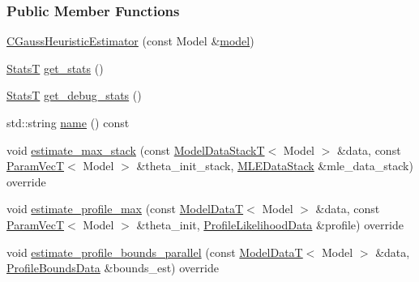 \subsubsection*{Public Member Functions}
\begin{DoxyCompactItemize}
\item 
\hyperlink{classmappel_1_1estimator_1_1CGaussHeuristicEstimator_a2bedca746004a65da22bf0f73b023408}{C\+Gauss\+Heuristic\+Estimator} (const Model \&\hyperlink{classmappel_1_1estimator_1_1Estimator_a2f157410771fb79a20d4d54e505750d0}{model})
\item 
\hyperlink{namespacemappel_a04ab395b0cf82c4ce68a36b2212649a5}{StatsT} \hyperlink{classmappel_1_1estimator_1_1CGaussHeuristicEstimator_a0a82a57fa42ac4c8e3069213cbaa9882}{get\+\_\+stats} ()
\item 
\hyperlink{namespacemappel_a04ab395b0cf82c4ce68a36b2212649a5}{StatsT} \hyperlink{classmappel_1_1estimator_1_1CGaussHeuristicEstimator_a71ac0bcc11c8be5e32d83c475558c701}{get\+\_\+debug\+\_\+stats} ()
\item 
std\+::string \hyperlink{classmappel_1_1estimator_1_1CGaussHeuristicEstimator_a27928cd7bac831b1e7bd010e1cd62b72}{name} () const 
\item 
void \hyperlink{classmappel_1_1estimator_1_1ThreadedEstimator_a797b6479fbab450a42099cfdb07e900f}{estimate\+\_\+max\+\_\+stack} (const \hyperlink{namespacemappel_aaeb6665bc57476dd93c2df6ad8bc4768}{Model\+Data\+StackT}$<$ Model $>$ \&data, const \hyperlink{namespacemappel_a0f86d3153e4e27b095012f140eea58de}{Param\+VecT}$<$ Model $>$ \&theta\+\_\+init\+\_\+stack, \hyperlink{namespacemappel_1_1estimator_structmappel_1_1estimator_1_1MLEDataStack}{M\+L\+E\+Data\+Stack} \&mle\+\_\+data\+\_\+stack) override
\item 
void \hyperlink{classmappel_1_1estimator_1_1ThreadedEstimator_a16ce4964abd0e18da2f9ec7e8bd5b4ee}{estimate\+\_\+profile\+\_\+max} (const \hyperlink{namespacemappel_a97f050df953605381ae9c901c3b125f1}{Model\+DataT}$<$ Model $>$ \&data, const \hyperlink{namespacemappel_a0f86d3153e4e27b095012f140eea58de}{Param\+VecT}$<$ Model $>$ \&theta\+\_\+init, \hyperlink{namespacemappel_1_1estimator_structmappel_1_1estimator_1_1ProfileLikelihoodData}{Profile\+Likelihood\+Data} \&profile) override
\item 
void \hyperlink{classmappel_1_1estimator_1_1ThreadedEstimator_a518454a427336c48a83d145b917ec3f7}{estimate\+\_\+profile\+\_\+bounds\+\_\+parallel} (const \hyperlink{namespacemappel_a97f050df953605381ae9c901c3b125f1}{Model\+DataT}$<$ Model $>$ \&data, \hyperlink{structmappel_1_1estimator_1_1ProfileBoundsData}{Profile\+Bounds\+Data} \&bounds\+\_\+est) override

\end{DoxyCompactItemize}
